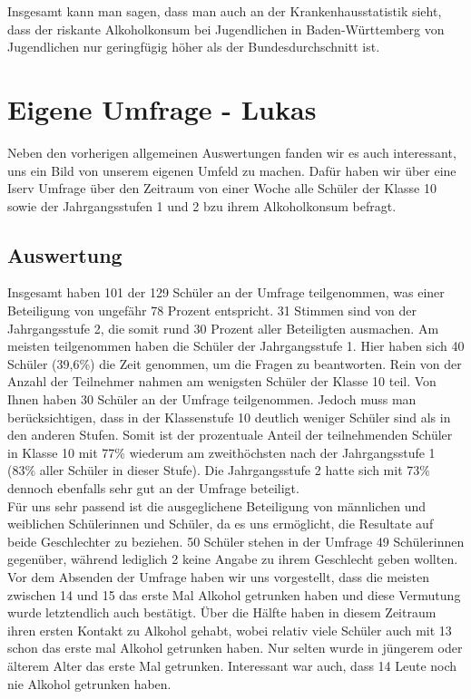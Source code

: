 \documentclass[12pt]{article}
\begin{document}
Insgesamt kann man sagen, dass man auch an der Krankenhausstatistik sieht, dass der riskante Alkoholkonsum bei Jugendlichen in Baden-Württemberg von Jugendlichen nur geringfügig höher als der Bundesdurchschnitt ist.

\section{Eigene Umfrage \footnotesize{- Lukas}}
Neben den vorherigen allgemeinen Auswertungen fanden wir es auch interessant, uns ein Bild von unserem eigenen Umfeld zu machen. Dafür haben wir über eine Iserv Umfrage über den Zeitraum von einer Woche alle Schüler der Klasse 10 sowie der Jahrgangsstufen 1 und 2 bzu ihrem Alkoholkonsum befragt.
\subsection{Auswertung}
Insgesamt haben 101 der 129 Schüler an der Umfrage teilgenommen, was einer Beteiligung von ungefähr 78 Prozent entspricht.
31 Stimmen sind von der Jahrgangsstufe 2, die somit rund 30 Prozent aller Beteiligten ausmachen. Am meisten teilgenommen haben die Schüler der Jahrgangsstufe 1. Hier haben sich 40 Schüler (39,6\%) die Zeit genommen, um die Fragen zu beantworten. Rein von der Anzahl der Teilnehmer nahmen am wenigsten Schüler der Klasse 10 teil. Von Ihnen haben 30 Schüler an der Umfrage teilgenommen. 
Jedoch muss man berücksichtigen, dass in der Klassenstufe 10 deutlich weniger Schüler sind als in den anderen Stufen. Somit ist der prozentuale Anteil der teilnehmenden Schüler in Klasse 10 mit 77\% wiederum am zweithöchsten nach der Jahrgangsstufe 1 (83\% aller Schüler in dieser Stufe). Die Jahrgangsstufe 2 hatte sich mit 73\% dennoch ebenfalls sehr gut an der Umfrage beteiligt.\\
Für uns sehr passend ist die ausgeglichene Beteiligung von männlichen und weiblichen Schülerinnen und Schüler, da es uns ermöglicht, die Resultate auf beide Geschlechter zu beziehen. 50 Schüler stehen in der Umfrage 49 Schülerinnen gegenüber, während lediglich 2 keine Angabe zu ihrem Geschlecht geben wollten. 
Vor dem Absenden der Umfrage haben wir uns vorgestellt, dass die meisten zwischen 14 und 15 das erste Mal Alkohol getrunken haben und diese Vermutung wurde letztendlich auch bestätigt. Über die Hälfte haben in diesem Zeitraum ihren ersten Kontakt zu Alkohol gehabt, wobei relativ viele Schüler auch mit 13 schon das erste mal Alkohol getrunken haben. Nur selten wurde in jüngerem oder älterem Alter das erste Mal getrunken. Interessant war auch, dass 14 Leute noch nie Alkohol getrunken haben. \\
\end{document}
